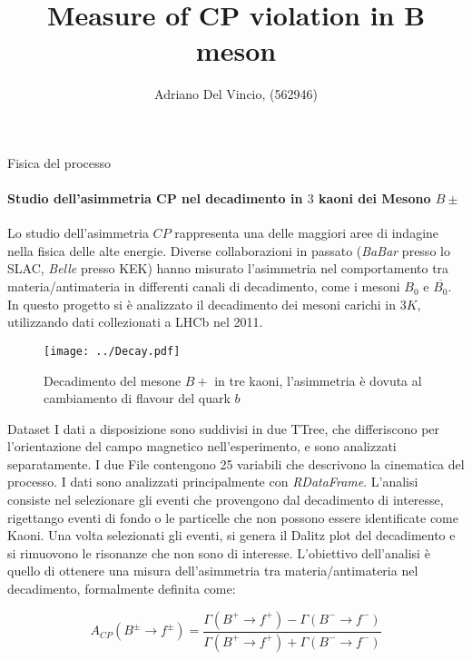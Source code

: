 \documentclass[8pt,a4paper]{beamer}
\author{Adriano Del Vincio, (562946)}
\title{Measure of CP violation in B meson}
\begin{document}
\frame{\titlepage}

\begin{frame}{Fisica del processo}
\framesubtitle{Studio dell'asimmetria CP nel decadimento in $3$ kaoni dei Mesono $B\pm$}

Lo studio dell'asimmetria $CP$ rappresenta una delle maggiori aree di indagine nella fisica delle alte energie. Diverse collaborazioni in passato (\textit{BaBar} presso lo SLAC, \textit{Belle} presso KEK) hanno misurato l'asimmetria nel comportamento tra materia/antimateria in differenti canali di decadimento, come i mesoni $B_{0}$ e $\overline{B_{0}}$. In questo progetto si è analizzato il decadimento dei mesoni carichi in  $3 K$, utilizzando dati collezionati a LHCb nel 2011.

\begin{figure}[hbtp]
\centering
\texttt{[image: ../Decay.pdf]}
\caption{Decadimento del mesone $B+$ in tre kaoni, l'asimmetria è dovuta al cambiamento di flavour del quark $b$}
\end{figure}
\end{frame}

\begin{frame}{Dataset}
I dati a disposizione sono suddivisi in due TTree, che differiscono per l'orientazione del campo magnetico nell'esperimento, e sono analizzati separatamente. I due File contengono 25 variabili che descrivono la cinematica del processo.
I dati sono analizzati principalmente con \textit{RDataFrame}. L'analisi consiste nel selezionare gli eventi che provengono dal decadimento di interesse, rigettango eventi di fondo o le particelle che non possono essere identificate come Kaoni. Una volta selezionati gli eventi, si genera il Dalitz plot del decadimento e si rimuovono le risonanze che non sono di interesse. L'obiettivo dell'analisi è quello di ottenere una misura dell'asimmetria tra materia/antimateria nel decadimento, formalmente definita come:

\begin{equation}
A_{CP}(B^{\pm} \rightarrow f^{\pm}) = \dfrac{\Gamma(B^{+} \rightarrow f^{+}) - \Gamma(B^{-} \rightarrow f^{-})}{ \Gamma(B^{+} \rightarrow f^{+}) + \Gamma(B^{-} \rightarrow f^{-})}
\end{equation}
\end{frame}
\end{document}
